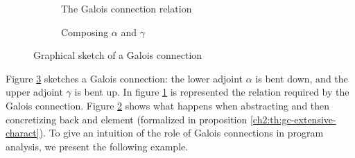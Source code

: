 \begin{figure}[ht]
	\centering
	\begin{subfigure}{.5\textwidth}
		\centering
		{
			\selectfont
			\def\svgwidth{.8\textwidth}
			
		}
		\caption{The Galois connection relation}
		\label{ch2:fig:gc-sketch:relation}
	\end{subfigure}%
	\begin{subfigure}{.5\textwidth}
		\centering
		{
			\selectfont
			\def\svgwidth{.8\textwidth}
			
		}
		\caption{Composing $\alpha$ and $\gamma$}
		\label{ch2:fig:gc-sketch:gamma-alpha-c}
	\end{subfigure}
	\caption{Graphical sketch of a Galois connection}
	\label{ch2:fig:gc-sketch}
\end{figure}
Figure \ref{ch2:fig:gc-sketch} sketches a Galois connection: the lower adjoint $\alpha$ is bent down, and the upper adjoint $\gamma$ is bent up.
In figure \ref{ch2:fig:gc-sketch:relation} is represented the relation required by the Galois connection. Figure \ref{ch2:fig:gc-sketch:gamma-alpha-c} shows what happens when abstracting and then concretizing back and element (formalized in proposition \ref{ch2:th:gc-extensive-charact}).
To give an intuition of the role of Galois connections in program analysis, we present the following example.

